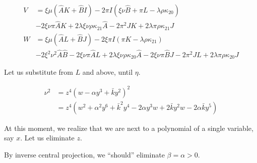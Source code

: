 \begin{align}
V &= \xi \mu(\hat AK  + \hat BI )-2\pi I(\xi \nu \hat B + \pi L - \lambda \rho \kappa_{20}) \\
& -2\xi \nu \pi \hat A K +2 \lambda \xi \nu \rho \kappa_{21} \hat A -2  \pi^2 J K +2 \lambda \pi \rho \kappa_{21} J\\
W &= \xi \mu(\hat AL + \hat BJ) -2\xi \pi I(\pi K - \lambda \rho \kappa_{21})\\
&-2\xi^2 \nu^2 \hat A \hat B -2 \xi \nu \pi \hat A L +2 \lambda \xi \nu \rho \kappa_{20} \hat A-2 \xi \nu \pi \hat B J -2 \pi^2 J L +2 \lambda \pi \rho \kappa_{20} J
\end{align}

Let us substitute from $L$ and above, until $\eta$.

\begin{align}
\nu^2 &= z^4 ( w - \alpha y^3 + \bar k y^2)^2 \\
&= z^4 (w^2 + \alpha^2 y^6 + \bar k^2 y^4 - 2  \alpha y^3 w + 2 \bar k y^2 w - 2 \alpha \bar k y^5)
\end{align}

At this moment, we realize that we are next to a polynomial of a single variable, say $x$. Let us eliminate $z$.

By inverse central projection, we ``should'' eliminate $\beta = \alpha > 0$.

